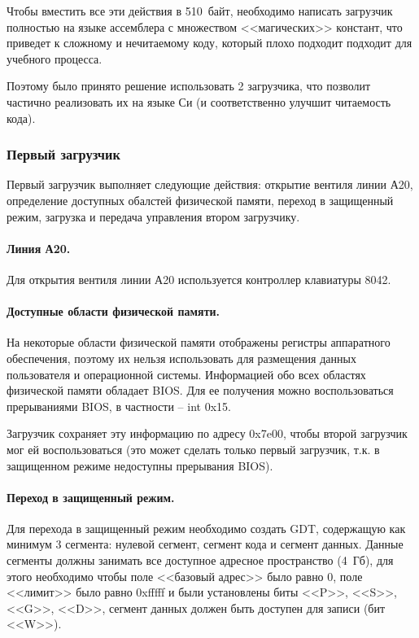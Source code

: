 Чтобы вместить все эти действия в 510~байт, необходимо написать загрузчик полностью
на языке ассемблера с множеством <<магических>> констант, что приведет к сложному и
нечитаемому коду, который плохо подходит подходит для учебного процесса.

Поэтому было принято решение использовать 2 загрузчика, что позволит частично реализовать
их на языке Си (и соответственно улучшит читаемость кода).

\subsubsection*{Первый загрузчик}
Первый загрузчик выполняет следующие действия: открытие вентиля линии А20, определение доступных
обалстей физической памяти, переход в защищенный режим, загрузка и передача управления
втором загрузчику.

\paragraph{Линия А20.} Для открытия вентиля линии А20 используется контроллер клавиатуры 8042.

\paragraph{Доступные области физической памяти.} На некоторые области физической памяти
отображены регистры аппаратного обеспечения, поэтому их нельзя использовать для размещения
данных пользователя и операционной системы. Информацией обо всех областях физической памяти
обладает BIOS. Для ее получения можно воспользоваться прерываниями BIOS, в частности -- int 0x15.

Загрузчик сохраняет эту информацию по адресу 0x7e00, чтобы второй загрузчик мог ей воспользоваться
(это может сделать только первый загрузчик, т.к. в защищенном режиме недоступны прерывания BIOS).

\paragraph{Переход в защищенный режим.} Для перехода в защищенный режим необходимо создать GDT,
содержащую как минимум 3 сегмента: нулевой сегмент, сегмент кода и сегмент данных. Данные сегменты
должны занимать все доступное адресное пространство (4~Гб), для этого необходимо чтобы поле
<<базовый адрес>> было равно 0, поле <<лимит>> было равно 0xfffff и были установлены биты
<<P>>, <<S>>, <<G>>, <<D>>, сегмент данных должен быть доступен для записи (бит <<W>>).

